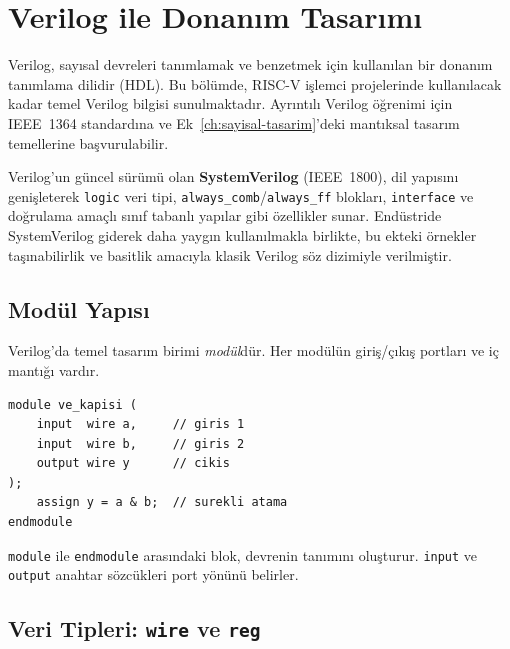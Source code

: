 \section{Verilog ile Donanım Tasarımı}
\label{sec:ekd-verilog}

Verilog, sayısal devreleri tanımlamak ve benzetmek için kullanılan bir donanım tanımlama dilidir (HDL). Bu bölümde, RISC-V işlemci projelerinde kullanılacak kadar temel Verilog bilgisi sunulmaktadır. Ayrıntılı Verilog öğrenimi için IEEE~1364 standardına ve Ek~\ref{ch:sayisal-tasarim}'deki mantıksal tasarım temellerine başvurulabilir.

Verilog'un güncel sürümü olan \textbf{SystemVerilog} (IEEE~1800), dil yapısını genişleterek \texttt{logic} veri tipi, \texttt{always\_comb}/\texttt{always\_ff} blokları, \texttt{interface} ve doğrulama amaçlı sınıf tabanlı yapılar gibi özellikler sunar. Endüstride SystemVerilog giderek daha yaygın kullanılmakla birlikte, bu ekteki örnekler taşınabilirlik ve basitlik amacıyla klasik Verilog söz dizimiyle verilmiştir.

\subsection{Modül Yapısı}
\label{sec:ekd-modul}

Verilog'da temel tasarım birimi \emph{modül}dür. Her modülün giriş/çıkış portları ve iç mantığı vardır.

\begin{lstlisting}[style=verilog, caption={Verilog modül yapısı: 2 girişli VE kapısı}, label={lst:ekd-ve-kapisi}]
module ve_kapisi (
    input  wire a,     // giris 1
    input  wire b,     // giris 2
    output wire y      // cikis
);
    assign y = a & b;  // surekli atama
endmodule
\end{lstlisting}

\texttt{module} ile \texttt{endmodule} arasındaki blok, devrenin tanımını oluşturur. \texttt{input} ve \texttt{output} anahtar sözcükleri port yönünü belirler.

\subsection{Veri Tipleri: \texttt{wire} ve \texttt{reg}}
\label{sec:ekd-wire-reg}

